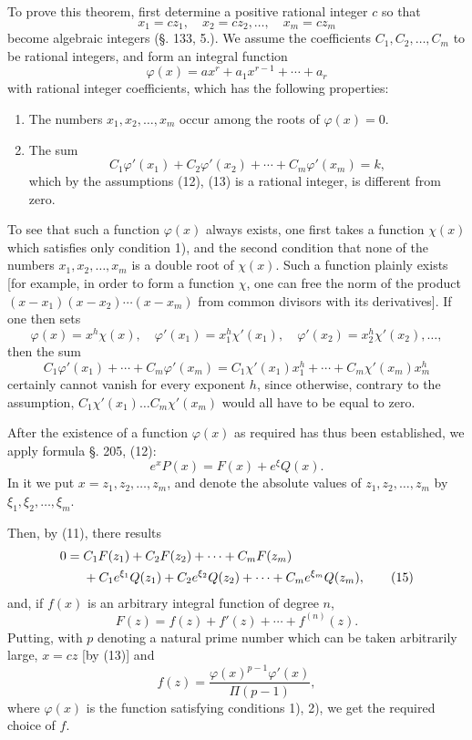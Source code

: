 \documentclass[11pt]{article}
\begin{document}
To prove this theorem, first determine a positive rational integer $c$ so that
\begin{equation}\tag{13}
x_1=cz_1,\quad x_2=cz_2,\ldots,\quad x_m=cz_m
\end{equation}
become algebraic integers (§. 133, 5.). We assume the coefficients $C_1,C_2,\ldots,C_m$ to be rational integers, and form an integral function
\begin{equation}\tag{14}
\varphi(x)=ax^r+a_1x^{r-1}+\cdots+a_r
\end{equation}
with rational integer coefficients, which has the following properties:
\begin{enumerate}[label=\arabic*)]
\item The numbers $x_1,x_2,\ldots,x_m$ occur among the roots of $\varphi(x)=0$.
\item The sum
\[
C_1\varphi'(x_1)+C_2\varphi'(x_2)+\cdots+C_m\varphi'(x_m)=k,
\]
which by the assumptions (12), (13) is a rational integer, is different from zero.
\end{enumerate}

To see that such a function $\varphi(x)$ always exists, one first takes a function $\chi(x)$ which satisfies only condition 1), and the second condition that none of the numbers $x_1,x_2,\ldots,x_m$ is a double root of $\chi(x)$. Such a function plainly exists [for example, in order to form a function $\chi$, one can free the norm of the product $(x-x_1)(x-x_2)\cdots(x-x_m)$ from common divisors with its derivatives]. If one then sets
\[
\varphi(x)=x^h\chi(x),\quad
\varphi'(x_1)=x_1^h\chi'(x_1),\quad
\varphi'(x_2)=x_2^h\chi'(x_2),\ldots,
\]
then the sum
\[
C_1\varphi'(x_1)+\cdots+C_m\varphi'(x_m)
=
C_1\chi'(x_1)x_1^h+\cdots+C_m\chi'(x_m)x_m^h
\]
certainly cannot vanish for every exponent $h$, since otherwise, contrary to the assumption, $C_1\chi'(x_1)\ldots C_m\chi'(x_m)$ would all have to be equal to zero.

After the existence of a function $\varphi(x)$ as required has thus been established, we apply formula §. 205, (12):
\[
e^xP(x)=F(x)+e^\xi Q(x).
\]
In it we put $x=z_1,z_2,\ldots,z_m$, and denote the absolute values of $z_1,z_2,\ldots,z_m$ by $\xi_1,\xi_2,\ldots,\xi_m$.

Then, by (11), there results
\begin{align}
0={}&C_1F(z_1)+C_2F(z_2)+\cdots+C_mF(z_m)\notag\\
&+C_1e^{\xi_1}Q(z_1)+C_2e^{\xi_2}Q(z_2)+\cdots+C_me^{\xi_m}Q(z_m),
\tag{15}
\end{align}
and, if $f(x)$ is an arbitrary integral function of degree $n$,
\begin{equation}\tag{16}
F(z)=f(z)+f'(z)+\cdots+f^{(n)}(z).
\end{equation}
Putting, with $p$ denoting a natural prime number which can be taken arbitrarily large, $x=cz$ [by (13)] and
\begin{equation}\tag{17}
f(z)=\frac{\varphi(x)^{p-1}\varphi'(x)}{\Pi(p-1)},
\end{equation}
where $\varphi(x)$ is the function satisfying conditions 1), 2), we get the required choice of $f$.
\end{document}
